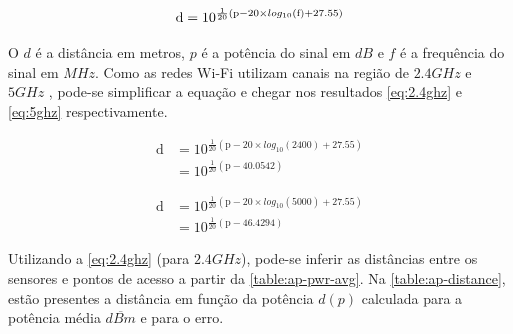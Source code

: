 \begin{equation}
	\text{d} = 10 ^{ \frac{1}{20} \left( \text{p} - 20 \times log_{10}\left(\text{f}\right)  + 27.55 \right) } \\
\end{equation}

O $d$ é a distância em metros, $p$ é a potência do sinal em $dB$ e $f$
é a frequência do sinal em $MHz$. Como as redes Wi-Fi utilizam canais na região
de $2.4GHz$ e $5GHz$ \cite{ieee80211}, pode-se simplificar a equação e chegar nos
resultados \autoref{eq:2.4ghz} e \autoref{eq:5ghz} respectivamente.

\begin{align}
\text{d}	&= 10 ^{ \frac{1}{20} \left( \text{p} - 20 \times log_{10}\left(\text{2400}\right)  + 27.55 \right) } \nonumber \\
			&= 10 ^{ \frac{1}{20} \left( \text{p} - 40.0542 \right) } \label{eq:2.4ghz}
\end{align}

\begin{align}
\text{d}	&= 10 ^{ \frac{1}{20} \left( \text{p} - 20 \times log_{10}\left(\text{5000}\right)  + 27.55 \right) } \nonumber \\
			&= 10 ^{ \frac{1}{20} \left( \text{p} - 46.4294 \right) } \label{eq:5ghz}
\end{align}

Utilizando a \autoref{eq:2.4ghz} (para $2.4GHz$), pode-se inferir as distâncias entre os sensores
e pontos de acesso a partir da \autoref{table:ap-pwr-avg}. Na
\autoref{table:ap-distance}, estão presentes a distância em função da potência $d(p)$
calculada para a potência média $\overline{dBm}$ e para o erro.


\begin{table}[htb]
\end{table}

